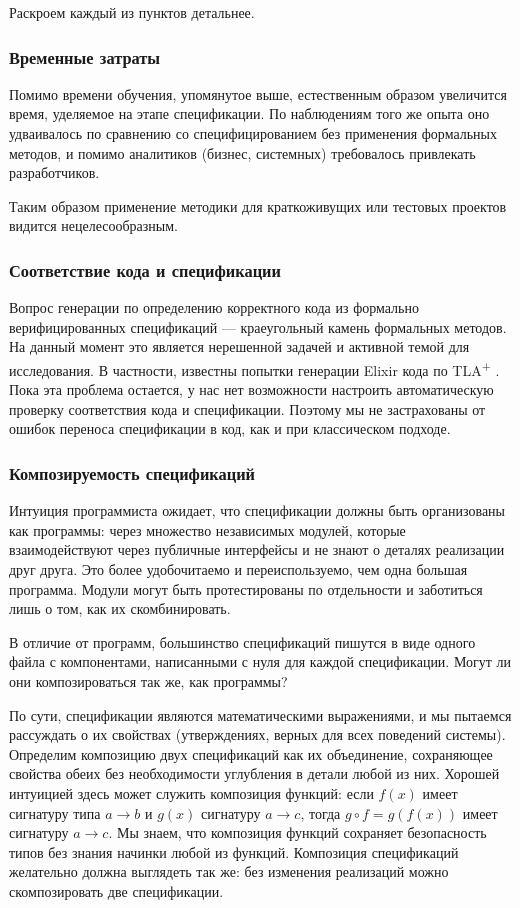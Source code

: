 \documentclass[14pt, openany]{report}
\newcommand{\tlapl}{TLA\textsuperscript{+} }
\begin{document}
Раскроем каждый из пунктов детальнее.


\subsubsection{Временные затраты}
Помимо времени обучения, упомянутое выше, естественным образом увеличится время, уделяемое на этапе спецификации. По наблюдениям того же опыта оно удваивалось по сравнению со специфицированием без применения формальных методов, и помимо аналитиков (бизнес, системных) требовалось привлекать разработчиков.

Таким образом применение методики для краткоживущих или тестовых проектов видится нецелесообразным.

\subsubsection{Соответствие кода и спецификации}
Вопрос генерации по определению корректного кода из формально верифицированных спецификаций --- краеугольный камень формальных методов. На данный момент это является нерешенной задачей и активной темой для исследования. В частности, известны попытки генерации Elixir кода по \tlapl \cite{tlaElixir}. Пока эта проблема остается, у нас нет возможности настроить автоматическую проверку соответствия кода и спецификации. Поэтому мы не застрахованы от ошибок переноса спецификации в код, как и при классическом подходе.

\subsubsection{Композируемость спецификаций}
Интуиция программиста ожидает, что спецификации должны быть организованы как программы: через множество независимых модулей, которые взаимодействуют через публичные интерфейсы и не знают о деталях реализации друг друга. Это более удобочитаемо и переиспользуемо, чем одна большая программа. Модули могут быть протестированы по отдельности и заботиться лишь о том, как их скомбинировать. 

В отличие от программ, большинство спецификаций пишутся в виде одного файла с компонентами, написанными с нуля для каждой спецификации. Могут ли они композироваться так же, как программы? 

По сути, спецификации являются математическими выражениями, и мы пытаемся рассуждать о их свойствах (утверждениях, верных для всех поведений системы). Определим композицию двух спецификаций как их объединение, сохраняющее свойства обеих без необходимости углубления в детали любой из них. Хорошей интуицией здесь может служить композиция функций: если \(f(x)\) имеет сигнатуру типа \(a \rightarrow b\) и \(g(x)\) сигнатуру \(a \rightarrow c\), тогда \(g \circ f = g(f(x))\) имеет сигнатуру \(a \rightarrow c\). Мы знаем, что композиция функций сохраняет безопасность типов без знания начинки любой из функций. Композиция спецификаций желательно должна выглядеть так же: без изменения реализаций можно скомпозировать две спецификации.
\end{document}
